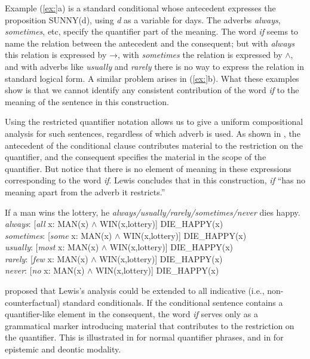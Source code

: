 Example (\ref{ex:}a) is a standard conditional whose antecedent expresses the proposition SUNNY(d), using \textit{d} as a variable for days. The adverbs \textit{always}, \textit{sometimes}, etc, specify the quantifier part of the meaning. The word \textit{if} seems to name the relation between the antecedent and the consequent; but with \textit{always} this relation is expressed by →, with \textit{sometimes} the relation is expressed by $\wedge$, and with adverbs like \textit{usually} and \textit{rarely} there is no way to express the relation in standard logical form. A similar problem arises in (\ref{ex:}b). What these examples show is that we cannot identify any consistent contribution of the word \textit{if} to the meaning of the sentence in this construction.



Using the restricted quantifier notation allows us to give a uniform compositional analysis for such sentences, regardless of which adverb is used. As shown in , the antecedent of the conditional clause contributes material to the restriction on the quantifier, and the consequent specifies the material in the scope of the quantifier. But notice that there is no element of meaning in these expressions corresponding to the word \textit{if}. Lewis concludes that in this construction, \textit{if} “has no meaning apart from the adverb it restricts.”


\ea
If a man wins the lottery, he \textit{always/usually/rarely/sometimes/never} dies happy.\\
\textit{always}:  [\textit{all} x: MAN(x) $\wedge$ WIN(x,lottery)] DIE\_HAPPY(x)\\
\textit{sometimes}:  [\textit{some} x: MAN(x) $\wedge$ WIN(x,lottery)] DIE\_HAPPY(x)\\
\textit{usually}:  [\textit{most} x: MAN(x) $\wedge$ WIN(x,lottery)] DIE\_HAPPY(x)\\
\textit{rarely}:  [\textit{few} x: MAN(x) $\wedge$ WIN(x,lottery)] DIE\_HAPPY(x)\\
\textit{never}:  [\textit{no} x: MAN(x) $\wedge$ WIN(x,lottery)] DIE\_HAPPY(x)
\z


\citet{Kratzer1986} proposed that Lewis’s analysis could be extended to all indicative (i.e., non-counterfactual) standard conditionals. If the conditional sentence contains a quantifier-like element in the consequent, the word \textit{if} serves only as a grammatical marker introducing material that contributes to the restriction on the quantifier. This is illustrated in  for normal quantifier phrases, and in  for epistemic and deontic modality.



